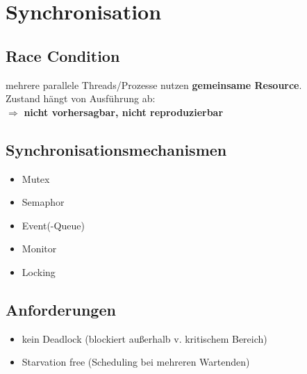 \section{Synchronisation}

\subsection{Race Condition}
mehrere parallele Threads/Prozesse nutzen \textbf{gemeinsame Resource}.\\
Zustand hängt von Ausführung ab:\\
$\Rightarrow$ \textbf{nicht vorhersagbar, nicht reproduzierbar}

\subsection{Synchronisationsmechanismen}
\begin{itemize}
    \item Mutex
    \item Semaphor
    \item Event(-Queue)
    \item Monitor
    \item Locking
\end{itemize}

\subsection{Anforderungen}
\begin{itemize}
    \item kein Deadlock (blockiert außerhalb v. kritischem Bereich)
    \item Starvation free (Scheduling bei mehreren Wartenden)
\end{itemize}